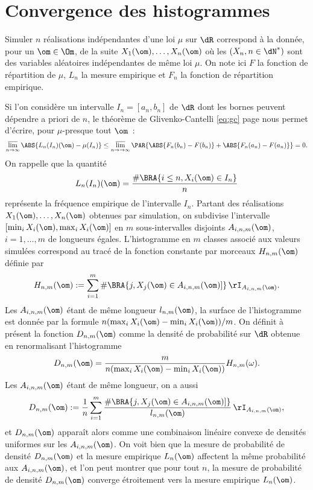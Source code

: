 %
\section{Convergence des histogrammes}
%

Simuler $n$ réalisations indépendantes d'une loi $\mu$ sur $\dR$ correspond à la
donnée, pour un $\om\in\Om$, de la suite $X_1(\om),\ldots,X_n(\om)$ où les $(X_n,
n\in\dN^*)$ sont des variables aléatoires indépendantes de même loi $\mu$. On note
ici $F$ la fonction de répartition de $\mu$, $L_n$ la mesure empirique et $F_n$
la fonction de répartition empirique.

Si l'on considère un intervalle $I_n=[a_n,b_n]$ de $\dR$ dont les bornes
peuvent dépendre a priori de $n$, le théorème de Glivenko-Cantelli
\eqref{eq:gc} page \pageref{th:gc} nous permet d'écrire, pour $\mu$-presque tout
$\om$~:
$$
\varlimsup_{n\to\infty} \ABS{L_n(I_n)(\om)-\mu(I_n)}
\leq\varlimsup_{n\to\to\infty}\PAR{\ABS{F_n(b_n)-F(b_n)}+\ABS{F_n(a_n)-F(a_n)}}= 0.
$$
On rappelle que la quantité
$$
L_n(I_n)(\om)=\frac{\#\BRA{i\leq n, X_i(\om)\in I_n}}{n}
$$
représente la fréquence empirique de l'intervalle $I_n$.  Partant des
réalisations $X_1(\om),\ldots,X_n(\om)$ obtenues par simulation, on subdivise
l'intervalle $[\min_i X_i(\om),\max_i X_i(\om)]$ en $m$ sous-intervalles
disjoints $A_{i,n,m}(\om)$, $i=1,\ldots,m$ de longueurs égales.  L'histogramme
en $m$ classes associé aux valeurs simulées correspond au tracé de la fonction
constante par morceaux $H_{n,m}(\om)$ définie par
$$
H_{n,m}(\om):=\sum_{i=1}^m \#\BRA{j, X_j(\om)\in A_{i,n,m}(\om)]}\,\rI_{A_{i,n,m}(\om)}.
$$
Les $A_{i,n,m}(\om)$ étant de même longueur $l_{n,m}(\om)$, la surface de
l'histogramme est donnée par la formule $n(\max_i X_i(\om)-\min_i
X_i(\om))/m$.  On définit à présent la fonction $D_{n,m}(\om)$ comme la
densité de probabilité sur $\dR$ obtenue en renormalisant l'histogramme
$$
D_{n,m}(\om)=\frac{m}{n(\max_i X_i(\om)-\min_i X_i(\om))} H_{n,m}(\omega).
$$
Les $A_{i,n,m}(\om)$ étant de même longueur, on a aussi
$$
D_{n,m}(\om):=
\frac{1}{n}\sum_{i=1}^m\frac{\#\BRA{j, X_j(\om)\in A_{i,n,m}(\om)]}}{l_{n,m}(\om)}\,\rI_{A_{i,n,m}(\om)},
$$
et $D_{n,m}(\om)$ apparaît alors comme une combinaison linéaire convexe de
densités uniformes sur les $A_{i,n,m}(\om)$. On voit bien que la mesure de
probabilité de densité $D_{n,m}(\om)$ et la mesure empirique $L_n(\om)$
affectent la même probabilité aux $A_{i,n,m}(\om)$, et l'on peut montrer que
pour tout $n$, la mesure de probabilité de densité $D_{n,m}(\om)$ converge
étroitement vers la mesure empirique $L_n(\om)$.

